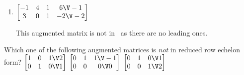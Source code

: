 \begin{example}
\begin{enumerate}
\item \(\begin{bmatrix} -1&4&1&6\V-1
\\3&0&1&-2\V-2
 \end{bmatrix}\)
\begin{solution} 
This augmented matrix is not in \rref\ as there are no leading ones. 
\end{solution}
\end{enumerate}
\end{example}



\begin{activity}
Which one of the following augmented matrices is \emph{not} in reduced row echelon form?
{\(\begin{bmatrix} 1&0&1\V2
\\0&1&0\V1 \end{bmatrix}\)}
{\(\begin{bmatrix} 0&1&1\V-1
\\0&0&0\V0 \end{bmatrix}\)}
{\(\begin{bmatrix} 0&1&0\V1
\\0&0&1\V2 \end{bmatrix}\)}
\end{activity}





